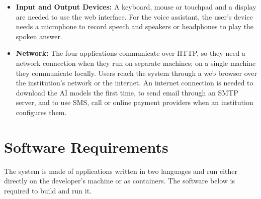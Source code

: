 \begin{itemize}
    \item \textbf{Input and Output Devices:}
    A keyboard, mouse or touchpad and a display are needed to use the web interface. For the voice assistant, the user's device needs a microphone to record speech and speakers or headphones to play the spoken answer.

    \item \textbf{Network:}
    The four applications communicate over HTTP, so they need a network connection when they run on separate machines; on a single machine they communicate locally. Users reach the system through a web browser over the institution's network or the internet. An internet connection is needed to download the AI models the first time, to send email through an SMTP server, and to use SMS, call or online payment providers when an institution configures them.
\end{itemize}

\section{Software Requirements}
The system is made of applications written in two languages and run either directly on the developer's machine or as containers. The software below is required to build and run it.

